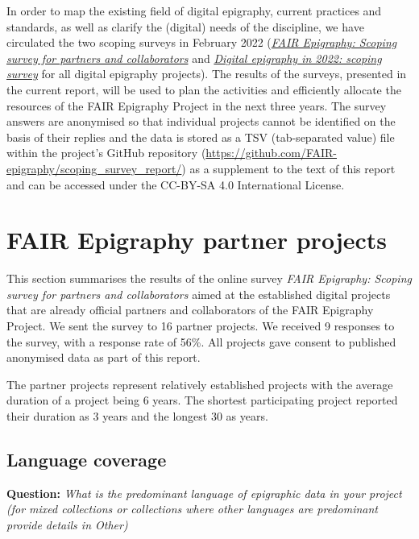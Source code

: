 \documentclass[
]{article}
\begin{document}
In order to map the existing field of digital epigraphy, current
practices and standards, as well as clarify the (digital) needs of the
discipline, we have circulated the two scoping surveys in February 2022
(\href{https://github.com/FAIR-epigraphy/scoping_survey_report/data/01_Survey_partners_questions.pdf}{\emph{FAIR
Epigraphy: Scoping survey for partners and collaborators}} and
\href{https://github.com/FAIR-epigraphy/scoping_survey_report/data/02_Survey_projects_questions.pdf}{\emph{Digital
epigraphy in 2022: scoping survey}} for all digital epigraphy projects).
The results of the surveys, presented in the current report, will be
used to plan the activities and efficiently allocate the resources of
the FAIR Epigraphy Project in the next three years. The survey answers
are anonymised so that individual projects cannot be identified on the
basis of their replies and the data is stored as a TSV (tab-separated
value) file within the project's GitHub repository
(\url{https://github.com/FAIR-epigraphy/scoping_survey_report/}) as a
supplement to the text of this report and can be accessed under the
CC-BY-SA 4.0 International License.

\hypertarget{fair-epigraphy-partner-projects}{%
\section{FAIR Epigraphy partner
projects}\label{fair-epigraphy-partner-projects}}

This section summarises the results of the online survey \emph{FAIR
Epigraphy: Scoping survey for partners and collaborators} aimed at the
established digital projects that are already official partners and
collaborators of the FAIR Epigraphy Project. We sent the survey to 16
partner projects. We received 9 responses to the survey, with a response
rate of 56\%. All projects gave consent to published anonymised data as
part of this report.

The partner projects represent relatively established projects with the
average duration of a project being 6 years. The shortest participating
project reported their duration as 3 years and the longest 30 as years.

\hypertarget{language-coverage}{%
\subsection{Language coverage}\label{language-coverage}}

\textbf{Question:} \emph{What is the predominant language of epigraphic
data in your project (for mixed collections or collections where other
languages are predominant provide details in Other)}
\end{document}
